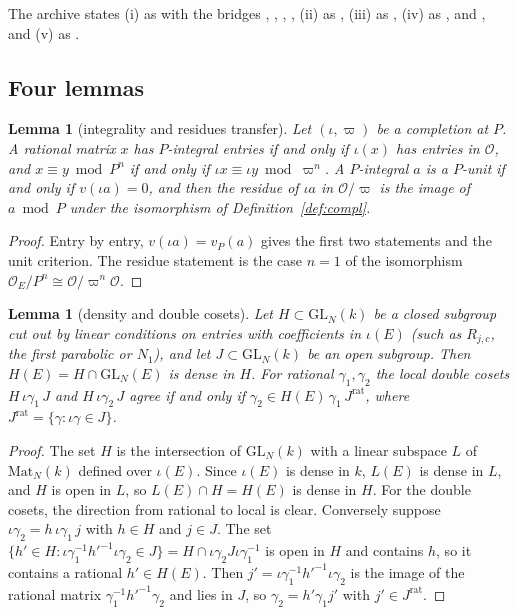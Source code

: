 \documentclass[11pt]{article}
\newcommand{\OEr}{\mathcal O_E}
\newcommand{\Ok}{\mathcal O}
\newcommand{\GL}{\mathrm{GL}}
\newcommand{\Mat}{\mathrm{Mat}}
\newtheorem{lemma}[theorem]{Lemma}
\theoremstyle{definition}
\theoremstyle{remark}
\begin{document}
The archive states (i) as  with the bridges , , , , (ii) as , (iii) as , (iv) as ,  and , and (v) as .

\subsection{Four lemmas}

\begin{lemma}[integrality and residues transfer]\label{lem:C1}
Let $(\iota,\varpi)$ be a completion at $P$. A rational matrix $x$ has $P$-integral entries if and only if $\iota(x)$ has entries in $\Ok$, and $x\equiv y\bmod P^n$ if and only if $\iota x\equiv\iota y\bmod\varpi^n$. A $P$-integral $a$ is a $P$-unit if and only if $v(\iota a)=0$, and then the residue of $\iota a$ in $\Ok/\varpi$ is the image of $a\bmod P$ under the isomorphism of Definition~\ref{def:compl}.
\end{lemma}

\begin{proof}
Entry by entry, $v(\iota a)=v_P(a)$ gives the first two statements and the unit criterion. The residue statement is the case $n=1$ of the isomorphism $\OEr/P^n\cong\Ok/\varpi^n\Ok$.
\end{proof}

\begin{lemma}[density and double cosets]\label{lem:C2}
Let $H\subset\GL_N(k)$ be a closed subgroup cut out by linear conditions on entries with coefficients in $\iota(E)$ (such as $R_{j,c}$, the first parabolic or $N_1$), and let $J\subset\GL_N(k)$ be an open subgroup. Then $H(E)=H\cap\GL_N(E)$ is dense in $H$. For rational $\gamma_1,\gamma_2$ the local double cosets $H\,\iota\gamma_1\,J$ and $H\,\iota\gamma_2\,J$ agree if and only if $\gamma_2\in H(E)\,\gamma_1\,J^{\mathrm{rat}}$, where $J^{\mathrm{rat}}=\{\gamma:\iota\gamma\in J\}$.
\end{lemma}

\begin{proof}
The set $H$ is the intersection of $\GL_N(k)$ with a linear subspace $L$ of $\Mat_N(k)$ defined over $\iota(E)$. Since $\iota(E)$ is dense in $k$, $L(E)$ is dense in $L$, and $H$ is open in $L$, so $L(E)\cap H=H(E)$ is dense in $H$. For the double cosets, the direction from rational to local is clear. Conversely suppose $\iota\gamma_2=h\,\iota\gamma_1\,j$ with $h\in H$ and $j\in J$. The set $\{h'\in H: \iota\gamma_1^{-1}h'^{-1}\iota\gamma_2\in J\}=H\cap\iota\gamma_2 J\iota\gamma_1^{-1}$ is open in $H$ and contains $h$, so it contains a rational $h'\in H(E)$. Then $j'=\iota\gamma_1^{-1}h'^{-1}\iota\gamma_2$ is the image of the rational matrix $\gamma_1^{-1}h'^{-1}\gamma_2$ and lies in $J$, so $\gamma_2=h'\gamma_1 j'$ with $j'\in J^{\mathrm{rat}}$.
\end{proof}
\end{document}
